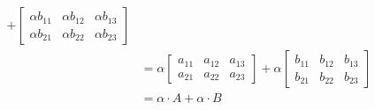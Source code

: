 \begin{exemplo}
\begin{enumerate}[label={\arabic*})]
\begin{solucao}
\begin{itemize}
\begin{align*}
					            + \begin{bmatrix} \alpha b_{11} & \alpha b_{12} & \alpha b_{13}\\ \alpha b_{21} & \alpha b_{22} & \alpha b_{23} \end{bmatrix}
					            \\ &= \alpha\begin{bmatrix} a_{11} & a_{12} & a_{13}\\a_{21} & a_{22} & a_{23}\end{bmatrix} +
					            \alpha\begin{bmatrix} b_{11} & b_{12} & b_{13}\\b_{21} & b_{22} & b_{23}\end{bmatrix}
					            \\ &= \alpha\cdot A + \alpha\cdot B
				            \end{align*}


\end{itemize}
\end{solucao}
\end{enumerate}
\end{exemplo}
